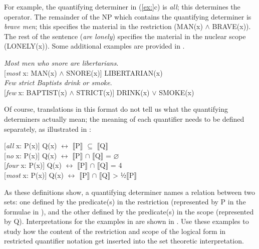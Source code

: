 For example, the quantifying determiner in (\ref{ex:}c) is \textit{all}; this determines the operator. The remainder of the NP which contains the quantifying determiner is \textit{brave men}; this specifies the material in the restriction (MAN(x) $\wedge$ BRAVE(x)). The rest of the sentence (\textit{are lonely}) specifies the material in the nuclear scope (LONELY(x)). Some additional examples are provided in .


\ea
\ea \textit{Most men who snore are libertarians}.\\
  {}[\textit{most} x: MAN(x) $\wedge$ SNORE(x)] LIBERTARIAN(x)\\
\ex \textit{Few strict Baptists drink or smoke}.\\
  {}[\textit{few} x: BAPTIST(x) $\wedge$ STRICT(x)] DRINK(x) $\vee$ SMOKE(x)
                       \z
\z


Of course, translations in this format do not tell us what the quantifying determiners actually mean; the meaning of each quantifier needs to be defined separately, as illustrated in :


\ea
\ea{} [\textit{all} x: P(x)] Q(x)  $\leftrightarrow $  \textsc{$\llbracket$}P$\rrbracket$  ${\subseteq}$ \textsc{$\llbracket$}Q$\rrbracket$ \\
\ex{} [\textit{no} x: P(x)] Q(x)  $\leftrightarrow $  \textsc{$\llbracket$}P$\rrbracket$  ${\cap}$ \textsc{$\llbracket$}Q$\rrbracket$  = ⌀\\
\ex{} [\textit{four} x: P(x)] Q(x)  $\leftrightarrow $  {\textbar} \textsc{$\llbracket$}P$\rrbracket$  ${\cap}$ \textsc{$\llbracket$}Q$\rrbracket$  {\textbar}  = 4\\
\ex{} [\textit{most} x: P(x)] Q(x)  $\leftrightarrow $  {\textbar} \textsc{$\llbracket$}P$\rrbracket$  ${\cap}$ \textsc{$\llbracket$}Q$\rrbracket$  {\textbar}  >  ½\textsc{{\textbar}}\textsc{$\llbracket$}P$\rrbracket$ {\textbar}
                       \z
\z


As these definitions show, a quantifying determiner names a relation between two sets: one defined by the predicate(s) in the restriction (represented by P in the formulae in ), and the other defined by the predicate(s) in the scope (represented by Q). Interpretations for the examples in  are shown in . Use these examples to study how the content of the restriction and scope of the logical form in restricted quantifier notation get inserted into the set theoretic interpretation.


